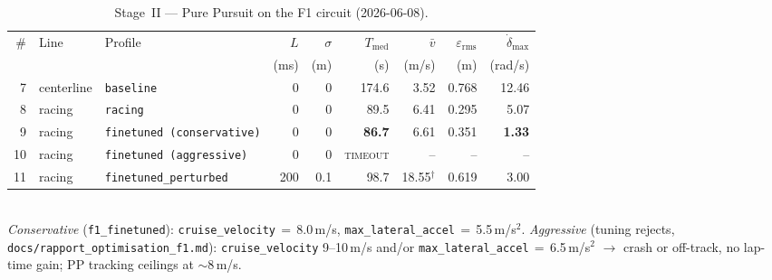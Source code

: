 \documentclass[11pt,a4paper]{article}
\newcommand{\best}[1]{\textbf{#1}}
\newcommand{\fail}{\textsc{timeout}}
\newcommand{\ndash}{--}
\newcommand{\cfg}[1]{\texttt{\small #1}}
\begin{document}
\begin{table}[H]
  \centering
  \caption{Stage~II --- Pure Pursuit on the F1 circuit (2026-06-08).}
  \label{tab:master-ii}
  \small
  \setlength{\tabcolsep}{5pt}
  \begin{tabular}{@{}r l l rr r r r r@{}}
    \toprule
    \# & Line & Profile & $L$ & $\sigma$ &
    $T_{\mathrm{med}}$ & $\bar{v}$ & $\varepsilon_{\mathrm{rms}}$ &
    $\dot{\delta}_{\max}$ \\
    & & & (ms) & (m) & (s) & (m/s) & (m) & (rad/s) \\
    \midrule
    7  & centerline & \cfg{baseline}             & 0   & 0   &
        174.6 & 3.52 & 0.768 & 12.46 \\
    8  & racing     & \cfg{racing}               & 0   & 0   &
         89.5 & 6.41 & 0.295 &  5.07 \\
    9  & racing     & \cfg{finetuned (conservative)} & 0   & 0   &
         \best{86.7} & 6.61 & 0.351 & \best{1.33} \\
    10 & racing     & \cfg{finetuned (aggressive)}   & 0   & 0   &
         \fail & \ndash & \ndash & \ndash \\
    11 & racing     & \cfg{finetuned\_perturbed} & 200 & 0.1 &
         98.7 & 18.55$^{\dag}$ & 0.619 & 3.00 \\
    \bottomrule
  \end{tabular}
  \\[0.3em]
  \footnotesize
  \textit{Conservative} (\cfg{f1\_finetuned}): \texttt{cruise\_velocity}\,$=$\,8.0\,m/s,
  \texttt{max\_lateral\_accel}\,$=$\,5.5\,m/s$^2$.
  \textit{Aggressive} (tuning rejects, \texttt{docs/rapport\_optimisation\_f1.md}):
  \texttt{cruise\_velocity} 9--10\,m/s and/or \texttt{max\_lateral\_accel}\,$=$\,6.5\,m/s$^2$
  $\rightarrow$ crash or off-track, no lap-time gain; PP tracking ceilings at ${\sim}$8\,m/s.
\end{table}
\end{document}
